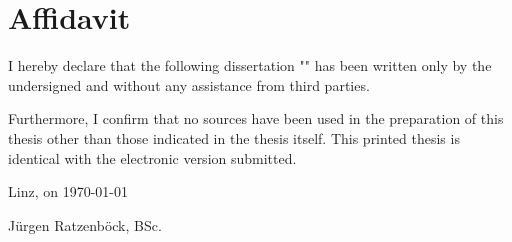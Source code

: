 \chapter*{Affidavit}

I hereby declare that the following dissertation "\thesistitle{}" has been written
only by the undersigned and without any assistance from third parties.

Furthermore, I confirm that no sources have been used in the preparation of this thesis other than those indicated in the thesis itself. This printed thesis is identical with the electronic version submitted.

Linz, on \today

\hfill J\"urgen Ratzenb\"ock, BSc.
